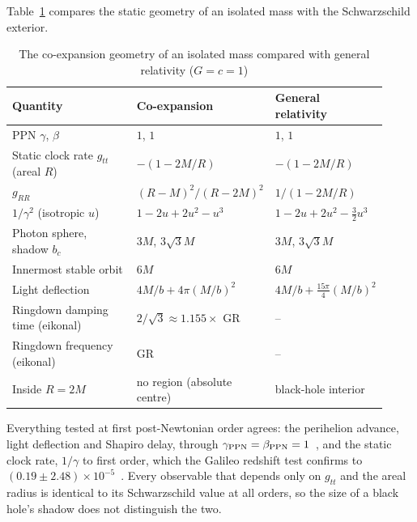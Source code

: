 \documentclass{iopjournal}
\begin{document}
Table~\ref{table_coexp} compares the static geometry of an isolated mass with the Schwarzschild exterior.

\begin{table}[h]
\caption{The co-expansion geometry of an isolated mass compared with general relativity ($G=c=1$)}
\label{table_coexp}
\begin{tabular}{@{}p{0.36\linewidth}p{0.27\linewidth}p{0.29\linewidth}@{}}
\toprule
Quantity & Co-expansion & General relativity\\
\midrule
PPN $\gamma$, $\beta$ & $1$, $1$ & $1$, $1$\\
Static clock rate $g_{tt}$ (areal $R$) & $-(1-2M/R)$ & $-(1-2M/R)$\\
$g_{RR}$ & $(R-M)^2/(R-2M)^2$ & $1/(1-2M/R)$\\
$1/\gamma^2$ (isotropic $u$) & $1-2u+2u^2-u^3$ & $1-2u+2u^2-\tfrac32u^3$\\
Photon sphere, shadow $b_c$ & $3M$, $3\sqrt3M$ & $3M$, $3\sqrt3M$\\
Innermost stable orbit & $6M$ & $6M$\\
Light deflection & $4M/b+4\pi(M/b)^2$ & $4M/b+\tfrac{15\pi}{4}(M/b)^2$\\
Ringdown damping time (eikonal) & $2/\sqrt3\approx1.155\times$ GR & --\\
Ringdown frequency (eikonal) & GR & --\\
Inside $R=2M$ & no region (absolute centre) & black-hole interior\\
\bottomrule
\end{tabular}
\end{table}

Everything tested at first post-Newtonian order agrees: the perihelion advance, light deflection and Shapiro delay, through $\gamma_{\rm PPN}=\beta_{\rm PPN}=1$~\cite{Will2014,Bertotti2003}, and the static clock rate, $1/\gamma$ to first order, which the Galileo redshift test confirms to $(0.19\pm2.48)\times10^{-5}$~\cite{Delva2018}. Every observable that depends only on $g_{tt}$ and the areal radius is identical to its Schwarzschild value at all orders, so the size of a black hole's shadow does not distinguish the two.
\end{document}

